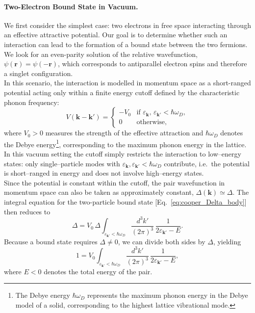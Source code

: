 \paragraph{Two-Electron Bound State in Vacuum.}
We first consider the simplest case: two electrons in free space interacting through an effective attractive potential. Our goal is to determine whether such an interaction can lead to the formation of a bound state between the two fermions. We look for an even-parity solution of the relative wavefunction, \(\psi(\mathbf{r}) = \psi(-\mathbf{r})\), which corresponds to antiparallel electron spins and therefore a singlet configuration.  \\
In this scenario, the interaction is modelled in momentum space as a short-ranged potential acting only within a finite energy cutoff defined by the characteristic phonon frequency:
\[
V(\mathbf{k}-\mathbf{k}') =
\begin{cases}
    -V_0 & \text{if } \varepsilon_{\mathbf{k}},\,\varepsilon_{\mathbf{k}'} < \hbar\omega_D,\\[6pt]
    0 & \text{otherwise},
\end{cases}
\]
where \(V_0 > 0\) measures the strength of the effective attraction and \(\hbar\omega_D\) denotes the Debye energy\footnote{%
The Debye energy \(\hbar\omega_D\) represents the maximum phonon energy in the Debye model of a solid, corresponding to the highest lattice vibrational mode.  
}, corresponding to the maximum phonon energy in the lattice. In this vacuum setting the cutoff simply restricts the interaction to low–energy states:
only single–particle modes with $\varepsilon_{\mathbf k},\varepsilon_{\mathbf k'}<\hbar\omega_D$ contribute, i.e.\ the potential is short–ranged in energy and does not involve high–energy states.\\
Since the potential is constant within the cutoff, the pair wavefunction in momentum space can also be taken as approximately constant, \(\Delta(\mathbf{k}) \simeq \Delta\).  
The integral equation for the two-particle bound state [Eq.~\eqref{eq:cooper_Delta_body}] then reduces to
\[
\Delta = V_0\,\Delta
\int_{\varepsilon_{\mathbf{k}'}<\hbar\omega_D}
\frac{d^3k'}{(2\pi)^3}\, \frac{1}{2\varepsilon_{\mathbf{k}'} - E}.
\]
Because a bound state requires \(\Delta \neq 0\), we can divide both sides by \(\Delta\), yielding
\[
1 = V_0
\int_{\varepsilon_{\mathbf{k}'} < \hbar\omega_D}
\frac{d^3k'}{(2\pi)^3}\,
\frac{1}{2\varepsilon_{\mathbf{k}'} - E},
\]
where \(E < 0\) denotes the total energy of the pair.  
